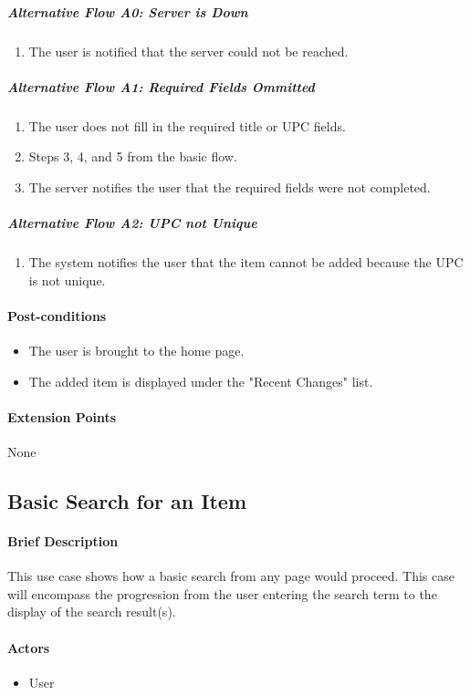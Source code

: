 \documentclass{article}
\begin{document}
\subparagraph{Alternative Flow A0: Server is Down}
\begin{enumerate}
\item The user is notified that the server could not be reached.
\end{enumerate}
\subparagraph{Alternative Flow A1: Required Fields Ommitted}
\begin{enumerate}
\item The user does not fill in the required title or UPC fields.
\item Steps 3, 4, and 5 from the basic flow.
\item The server notifies the user that the required fields were not completed.
\end{enumerate}
\subparagraph{Alternative Flow A2: UPC not Unique}
\begin{enumerate}
\item The system notifies the user that the item cannot be added because the UPC is not unique.
\end{enumerate}

\paragraph{Post-conditions}
\begin{itemize}
\item The user is brought to the home page.
\item The added item is displayed under the "Recent Changes" list.
\end{itemize}

\paragraph{Extension Points}
None

\subsection{Basic Search for an Item}

\paragraph{Brief Description}
This use case shows how a basic search from any page  would proceed. This case will encompass the progression from the user entering the search term to the display of the search result(s).

\paragraph{Actors}
\begin{itemize}
\item User
\end{itemize}
\end{document}

